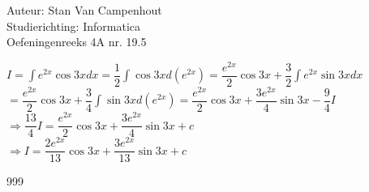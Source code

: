 \documentclass[a4paper]{article}
\begin{document}
  
\noindent \large Auteur: Stan Van Campenhout \\
\noindent \large Studierichting:  Informatica\\
\noindent \large Oefeningenreeks 4A nr. 19.5\\

\medskip

\normalsize

$ I = \displaystyle\int e^{2x}\cos3xdx = \dfrac{1}{2}\displaystyle\int\cos3xd\left(e^{2x}\right) = \dfrac{e^{2x}}{2}\cos3x + \dfrac{3}{2}\displaystyle\int e^{2x}\sin3xdx $\\

$ = \dfrac{e^{2x}}{2}\cos3x + \dfrac{3}{4}\displaystyle\int\sin3xd\left(e^{2x}\right) = \dfrac{e^{2x}}{2}\cos3x+\dfrac{3e^{2x}}{4}\sin3x - \dfrac{9}{4}I $\\

$ \Rightarrow \dfrac{13}{4}I = \dfrac{e^{2x}}{2}\cos3x+\dfrac{3e^{2x}}{4}\sin3x+c $\\

$ \Rightarrow I = \dfrac{2e^{2x}}{13}\cos3x+\dfrac{3e^{2x}}{13}\sin3x+c $\\

\begin{thebibliography}{999}
\end{thebibliography}
\end{document}
